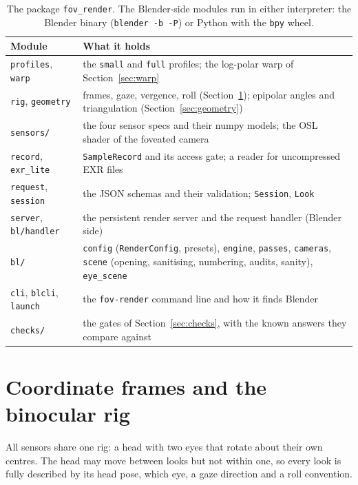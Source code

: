 \documentclass[11pt,a4paper]{article}
\newcommand{\code}[1]{\texttt{\small #1}}
\newcommand{\cell}{\raggedright\arraybackslash}
\begin{document}
\begin{table}[!htbp]
\centering\footnotesize
\begin{tabularx}{\textwidth}{@{}>{\cell}p{4.3cm} L@{}}
\toprule
Module & What it holds \\
\midrule
\code{profiles}, \code{warp} & the \code{small} and \code{full} profiles; the log-polar warp of Section~\ref{sec:warp} \\
\code{rig}, \code{geometry} & frames, gaze, vergence, roll (Section~\ref{sec:rig}); epipolar angles and
  triangulation (Section~\ref{sec:geometry}) \\
\code{sensors/} & the four sensor specs and their numpy models; the OSL shader of the foveated camera \\
\code{record}, \code{exr\_lite} & \code{SampleRecord} and its access gate; a reader for uncompressed EXR files \\
\code{request}, \code{session} & the JSON schemas and their validation; \code{Session}, \code{Look} \\
\code{server}, \code{bl/handler} & the persistent render server and the request handler (Blender side) \\
\code{bl/} & \code{config} (\code{RenderConfig}, presets), \code{engine}, \code{passes}, \code{cameras},
  \code{scene} (opening, sanitising, numbering, audits, sanity), \code{eye\_scene} \\
\code{cli}, \code{blcli}, \code{launch} & the \code{fov-render} command line and how it finds Blender \\
\code{checks/} & the gates of Section~\ref{sec:checks}, with the known answers they compare against \\
\bottomrule
\end{tabularx}
\caption{The package \code{fov\_render}. The Blender-side modules run in either interpreter: the Blender binary
(\code{blender -b -P}) or Python with the \code{bpy} wheel.}\label{tab:modules}
\end{table}

\section{Coordinate frames and the binocular rig}\label{sec:rig}

All sensors share one rig: a head with two eyes that rotate about their own centres. The head may move between
looks but not within one, so every look is fully described by its head pose, which eye, a gaze direction and a
roll convention.
\end{document}
